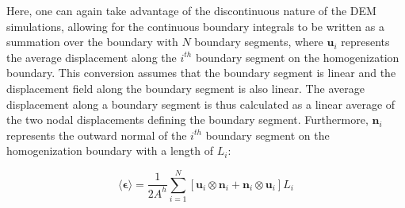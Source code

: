 Here, one can again take advantage of the discontinuous nature of the DEM simulations, allowing for the continuous boundary integrals to be written as a summation over the boundary with $N$ boundary segments, where $\mathbf{u}_{i}$ represents the average displacement along the $i^{th}$ boundary segment on the homogenization boundary. This conversion assumes that the boundary segment is linear and the displacement field along the boundary segment is also linear. The average displacement along a boundary segment is thus calculated as a linear average of the two nodal displacements defining the boundary segment. Furthermore, $\mathbf{n}_{i}$ represents the outward normal of the $i^{th}$ boundary segment on the homogenization boundary with a length of $L_{i}$:

\begin{equation}
\langle\boldsymbol{\epsilon}\rangle=\frac{1}{2A^{h}}\sum_{i=1}^{N}\left[\mathbf{u}_{i}\otimes\mathbf{n}_{i}+\mathbf{n}_{i}\otimes\mathbf{u}_{i}\right]L_{i}\label{eqn:strain7}
\end{equation}
